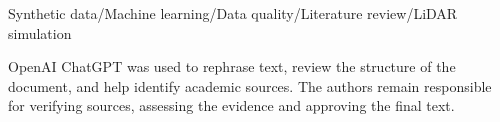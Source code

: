 \documentclass[10pt,a4paper]{article}
\begin{document}
\hypersetup{pageanchor=false}


\hypersetup{pageanchor=true}
\vspace{3mm}

\vspace{5mm}
Synthetic data\quad /\quad Machine learning\quad /\quad Data quality\quad /\quad Literature review\quad /\quad LiDAR simulation
\vspace{11mm}
\clearpage
{}




\clearpage
\begingroup
\raggedright
{}
\vspace{2mm}
{\small\color{muted}OpenAI ChatGPT was used to rephrase text, review the structure of the document, and help identify academic sources.
	The authors remain responsible for verifying sources, assessing the evidence
	and approving the final text.\par}
\printbibliography[heading=bibintoc,title={References}]
\endgroup
\clearpage
\begingroup
\printnoidxglossary[title={Glossary},style=papercompact]
\endgroup
\clearpage
\appendix
\titleformat{\section}{\Large\bfseries}{\makebox[11mm][l]{\color{muted}\fontsize{11}{13}\selectfont\thesection}}{0pt}{}

% 
\end{document}
